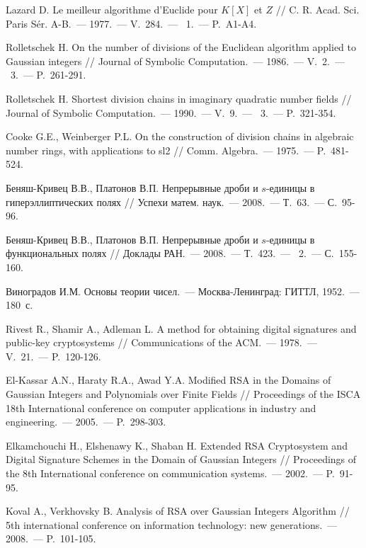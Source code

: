 \documentclass[_00_dissertation.tex]{subfiles}
\begin{document}
\begin{thebibliography}{99}
    Lazard D. Le meilleur algorithme d'{E}uclide pour {$K[X]$} et {$Z$} // C. R. Acad. Sci. Paris S\'er. A-B.~--- 1977.~--- V.~284.~--- \textnumero~1.~--- P.~A1-A4.

    Rolletschek H. On the number of divisions of the Euclidean algorithm applied to Gaussian integers // Journal of Symbolic Computation.~--- 1986.~--- V.~2.~--- \textnumero~3.~--- P.~261-291.
    
    Rolletschek H. Shortest division chains in imaginary quadratic number fields // Journal of Symbolic Computation.~--- 1990.~--- V.~9.~--- \textnumero~3.~--- P.~321-354.

    Cooke G.E., Weinberger P.L. On the construction of division chains in algebraic number rings, with applications to sl2 // Comm. Algebra.~--- 1975.~--- P.~481-524.

    Беняш-Кривец В.В., Платонов В.П. Непрерывные дроби и $s$-единицы в гиперэллиптических полях // Успехи матем. наук.~--- 2008.~--- Т.~63.~--- С.~95-96.
    
    Беняш-Кривец В.В., Платонов В.П. Непрерывные дроби и $s$-единицы в функциональных полях // Доклады РАН.~--- 2008.~--- Т.~423.~--- \textnumero~2.~--- С.~155-160.

    Виноградов И.М. Основы теории чисел.~--- Москва-Ленинград: ГИТТЛ, 1952.~--- 180~с.

    Rivest R., Shamir A., Adleman L. A method for obtaining digital signatures and public-key cryptosystems // Communications of the ACM.~--- 1978.~--- V.~21.~--- P.~120-126.

    El-Kassar A.N., Haraty R.A., Awad Y.A. Modified RSA in the Domains of Gaussian Integers and Polynomials over Finite Fields // Proceedings of the ISCA 18th International conference on computer applications in industry and engineering.~--- 2005.~--- P.~298-303.

    Elkamchouchi H., Elshenawy K., Shaban H. Extended RSA Cryptosystem and Digital Signature Schemes in the Domain of Gaussian Integers // Proceedings of the 8th International conference on communication systems.~--- 2002.~--- P.~91-95.

    Koval A., Verkhovsky B. Analysis of RSA over Gaussian Integers Algorithm // 5th international conference on information technology: new generations.~--- 2008.~--- P.~101-105.


\end{thebibliography}
\end{document}
